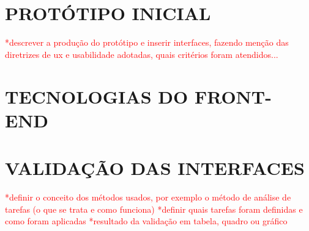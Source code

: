 



\section{PROTÓTIPO INICIAL}
\label{sec:prototipo}

\textcolor{red}{*descrever a produção do protótipo e inserir interfaces, fazendo menção das diretrizes de ux e usabilidade adotadas, quais critérios foram atendidos...}

\section{TECNOLOGIAS DO FRONT-END}
\label{sec:tecnologias}

\section{VALIDAÇÃO DAS INTERFACES}
\label{sec:validacao}

\textcolor{red}{*definir o conceito dos métodos usados, por exemplo o método de análise de tarefas (o que se trata e como funciona)
*definir quais tarefas foram definidas e como foram aplicadas
*resultado da validação em tabela, quadro ou gráfico}

